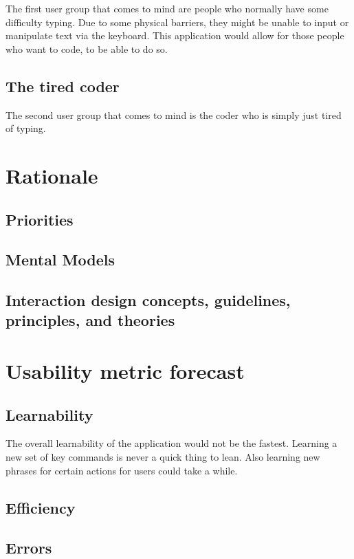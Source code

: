 \documentclass[11pt, oneside]{article}
\begin{document}
The first user group that comes to mind are people who normally have some difficulty typing. Due to some physical barriers, they might be unable to input or manipulate text via the keyboard. This application would allow for those people who want to code, to be able to do so.

\subsection{The tired coder}

The second user group that comes to mind is the coder who is simply just tired of typing.

\section{Rationale}

\subsection{Priorities}
\subsection{Mental Models}
\subsection{Interaction design concepts, guidelines, principles, and theories}



\section{Usability metric forecast}

\subsection{Learnability}
The overall learnability of the application would not be the fastest. Learning a new set of key commands is never a quick thing to lean. Also learning new phrases for certain actions for users could take a while.
\subsection{Efficiency}

\subsection{Errors}
\end{document}
